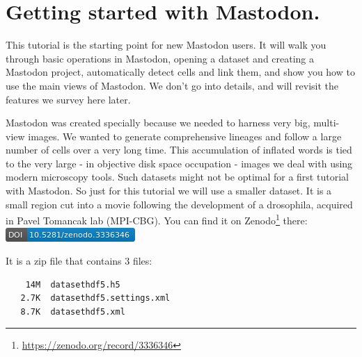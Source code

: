 \section{Getting started with Mastodon.}

This tutorial is the starting point for new Mastodon users. 
It will walk you through basic operations in Mastodon, opening a dataset and creating a Mastodon project, automatically detect cells and link them, and show you how to use the main views of Mastodon.
We don't go into details, and will revisit the features we survey here later.

Mastodon was created specially because we needed to harness very big, multi-view images. We wanted to generate  comprehensive lineages and follow a large number of cells over a very long time.
This accumulation of inflated words is tied to the very large  - in objective disk space  occupation - images we deal with using modern microscopy tools. 
Such datasets might not be optimal for a first tutorial with Mastodon.
So just for this tutorial we will use a smaller dataset.
It is a small region cut into a movie following the development of a drosophila, acquired in Pavel Tomancak lab (MPI-CBG).
You can find it on Zenodo\footnote{\href{https://zenodo.org/record/3336346}{https://zenodo.org/record/3336346}} there: \href{https://doi.org/10.5281/zenodo.3336346}{\includegraphics[height=1.4\fontcharht\font`\B]{figures/zenodo3336346.png}}

It is a zip file that contains 3 files:
\begin{verbatim}
    14M  datasethdf5.h5
   2.7K  datasethdf5.settings.xml
   8.7K  datasethdf5.xml
\end{verbatim}
